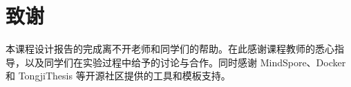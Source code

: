 \chapter*{致谢}

本课程设计报告的完成离不开老师和同学们的帮助。在此感谢课程教师的悉心指导，以及同学们在实验过程中给予的讨论与合作。同时感谢 MindSpore、Docker 和 TongjiThesis 等开源社区提供的工具和模板支持。
